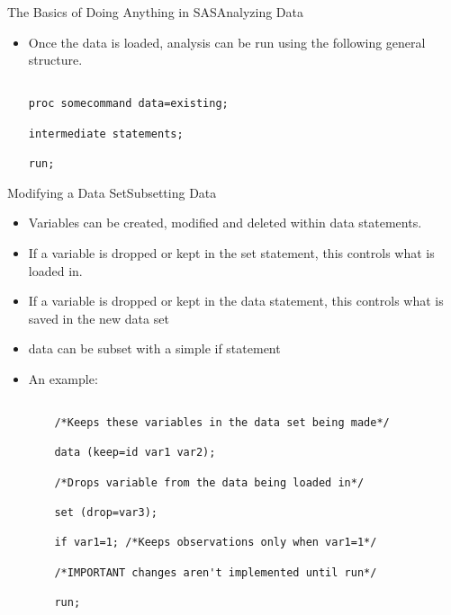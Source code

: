 \documentclass{beamer}
\begin{document}
\begin{frame}[fragile]{The Basics of Doing Anything in SAS}{Analyzing Data}

\begin{itemize}

\item Once the data is loaded, analysis can be run using the following general structure.

\begin{verbatim}

proc somecommand data=existing;

intermediate statements;

run;

\end{verbatim}

\end{itemize}

\end{frame}



\begin{frame}[fragile]{Modifying a Data Set}{Subsetting Data}

\begin{itemize}

    \item Variables can be created, modified and deleted within data statements.

    \item If a variable is dropped or kept in the set statement, this controls what is loaded in.

    \item If a variable is dropped or kept in the data statement, this controls what is saved in the new data set

    \item data can be subset with a simple if statement

    \item An example:

    \begin{small}

    \begin{verbatim}

    /*Keeps these variables in the data set being made*/

    data (keep=id var1 var2); 

    /*Drops variable from the data being loaded in*/

    set (drop=var3); 

    if var1=1; /*Keeps observations only when var1=1*/

    /*IMPORTANT changes aren't implemented until run*/

    run; 

    \end{verbatim}

    \end{small}

\end{itemize}



\end{frame}
\end{document}

